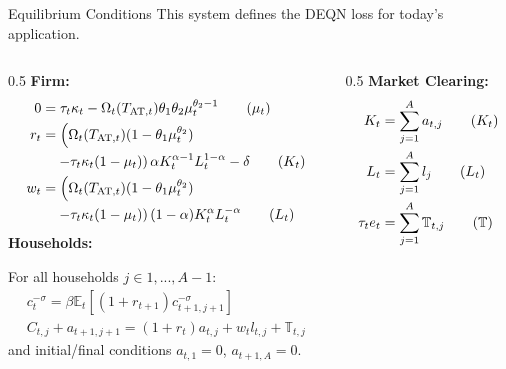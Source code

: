 \documentclass[10pt,aspectratio=169]{beamer}
\begin{document}
\begin{frame}[fragile]{Equilibrium Conditions}
{\footnotesize This system defines the DEQN loss for today's application.}
\begin{footnotesize}
  \begin{columns}[t]
        \begin{column}{0.5\textwidth}
        \textbf{Firm:}
            \begin{align}
                0 & = \tau_t \kappa_t  - \Omega_t (T_{\mathrm{AT}, t}) \theta_1 \theta_2 \mu_t^{\theta_2 -1} \tag{$\mu_t$}\\
                r_t & = \left( \Omega_t (T_{\mathrm{AT}, t}) (1 - \theta_1 \mu_t^{\theta_2}) \right. \notag \\
                    & \quad \left. - \tau_t \kappa_t (1 - \mu_t) \right) \alpha K_t^{\alpha - 1} L_t^{1 - \alpha} - \delta \tag{$K_t$}\\
                w_t & = \left( \Omega_t (T_{\mathrm{AT}, t}) (1 - \theta_1 \mu_t^{\theta_2}) \right. \notag\\
                    & \quad \left. - \tau_t \kappa_t (1 - \mu_t) \right) (1 - \alpha) K_t^{\alpha} L_t^{-\alpha} \tag{$L_t$}
            \end{align}
            \textbf{Households:}

            For all households $j \in 1,...,A-1$:
            \begin{align}
                c_t^{-\sigma}  = \beta \mathbb{E}_t \left[ (1+ r_{t+1}) c_{t+1,j+1}^{-\sigma} \right] \tag{EE} \\
                C_{t,j} + a_{t+1, j+1}  =  (1 + r_t) a_{t,j} + w_{t} l_{t,j} + \mathbb{T}_{t,j}  \tag{BC}
            \end{align}
            and initial/final conditions $a_{t,1} = 0$, $a_{t+1,A} = 0$.
        \end{column}
        \begin{column}{0.5\textwidth}
            \textbf{Market Clearing:}
            \begin{align}
                K_t & = \sum_{j = 1}^{A} a_{t,j} \tag{$K_t$}\\
            L_t & = \sum_{j = 1}^{A} l_j \tag{$L_t$} \\
            \tau_{t} e_t & = \sum_{j=1}^{A} \mathbb{T}_{t,j}  \tag{$\mathbb{T}$}
            \end{align}
        \end{column}
  \end{columns}
\end{footnotesize}
\end{frame}
\end{document}
